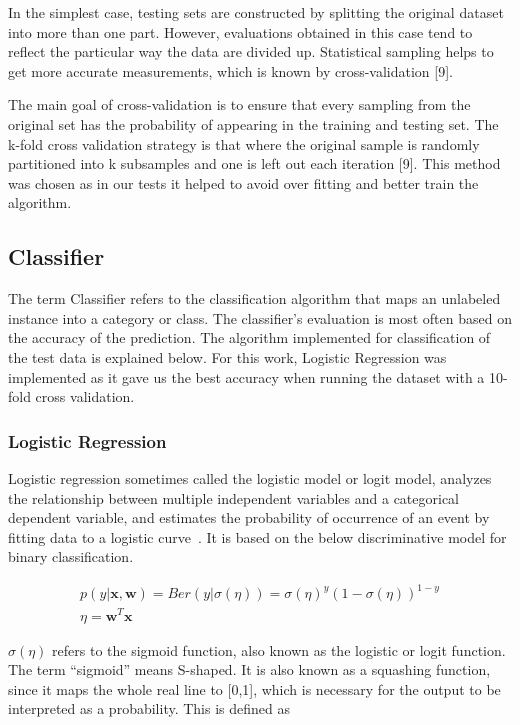 \documentclass[letterpaper,10pt]{article}
\theoremstyle{mytheor}
\begin{document}
In the simplest case, testing sets are constructed by splitting the original dataset into more than one part. However, evaluations obtained in this case tend to reflect the particular way the data are divided up. Statistical sampling helps to get more accurate measurements, which is known by cross-validation [9].

The main goal of cross-validation is to ensure that every sampling from the original set has the probability of appearing in the training and testing set. The k-fold cross validation strategy is that where the original sample is randomly partitioned into k subsamples and one is left out each iteration [9]. This method was chosen as in our tests it helped to avoid over fitting and better train the algorithm.

\subsection{Classifier}

The term Classifier refers to the classification algorithm that maps an unlabeled instance into a category or class. The classifier’s evaluation is most often based on the accuracy of the prediction. The algorithm implemented for classification of the test data is explained below. For this work, Logistic Regression was implemented as it gave us the best accuracy when running the dataset with a 10-fold cross validation.

\subsubsection{Logistic Regression}

Logistic regression sometimes called the logistic model or logit model, analyzes the relationship between multiple independent variables and a categorical dependent variable, and estimates the probability of occurrence of an event by fitting data to a logistic curve~\cite{park2013introduction}. It is based on the below discriminative model for binary classification.

\begin{gather}
p(y|\boldsymbol{x},\boldsymbol{w}) = Ber(y|\sigma(\eta)) = \sigma(\eta)^{y}(1 - \sigma(\eta))^{1-y} \\
\eta = \boldsymbol{w}^{T}\boldsymbol{x}
\end{gather}

$\sigma(\eta)$ refers to the sigmoid function, also known as the logistic or logit function. The term “sigmoid” means S-shaped. It is also known as a squashing function, since it maps the whole real line to [0,1], which is necessary for the output to be interpreted as a probability. This is defined as 
\end{document}
